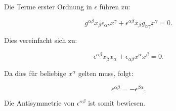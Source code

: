 Die Terme erster Ordnung in $\epsilon$ führen zu:

\[
g^{\alpha \beta} x_\beta \epsilon_{\alpha \gamma} x^\gamma + \epsilon^{\alpha \beta} x_\beta g_{\alpha \gamma} x^\gamma = 0.
\]

Dies vereinfacht sich zu:

\[
\epsilon^{\alpha \beta} x_\beta x_\alpha + \epsilon_{\alpha \beta} x^\alpha x^\beta = 0.
\]

Da dies für beliebige $x^\alpha$ gelten muss, folgt:

\[
\epsilon^{\alpha \beta} = -\epsilon^{\beta \alpha}.
\]

Die Antisymmetrie von $\epsilon^{\alpha \beta}$ ist somit bewiesen.